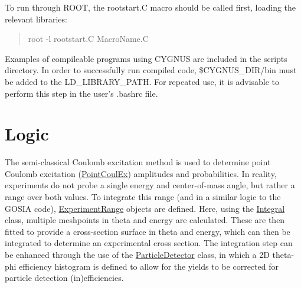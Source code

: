 To run through R\-O\-O\-T, the rootstart.\-C macro should be called first, loading the relevant libraries\-: \begin{quotation}
root -\/l rootstart.\-C Macro\-Name.\-C

\end{quotation}


Examples of compileable programs using C\-Y\-G\-N\-U\-S are included in the scripts directory. In order to successfully run compiled code, \$\-C\-Y\-G\-N\-U\-S\-\_\-\-D\-I\-R/bin must be added to the L\-D\-\_\-\-L\-I\-B\-R\-A\-R\-Y\-\_\-\-P\-A\-T\-H. For repeated use, it is advisable to perform this step in the user's .bashrc file.\hypertarget{index_Cygnus}{}\section{Logic}\label{index_Cygnus}
The semi-\/classical Coulomb excitation method is used to determine point Coulomb excitation (\hyperlink{classPointCoulEx}{Point\-Coul\-Ex}) amplitudes and probabilities. In reality, experiments do not probe a single energy and center-\/of-\/mass angle, but rather a range over both values. To integrate this range (and in a similar logic to the G\-O\-S\-I\-A code), \hyperlink{classExperimentRange}{Experiment\-Range} objects are defined. Here, using the \hyperlink{classIntegral}{Integral} class, multiple meshpoints in theta and energy are calculated. These are then fitted to provide a cross-\/section surface in theta and energy, which can then be integrated to determine an experimental cross section. The integration step can be enhanced through the use of the \hyperlink{classParticleDetector}{Particle\-Detector} class, in which a 2\-D theta-\/phi efficiency histogram is defined to allow for the yields to be corrected for particle detection (in)efficiencies. 